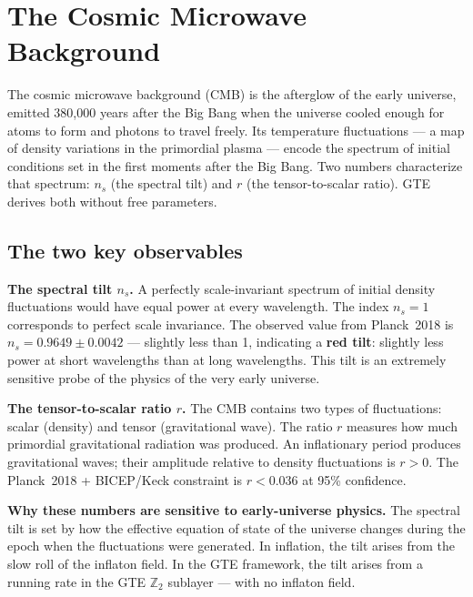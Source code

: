 \documentclass[11pt,a4paper]{article}
\newcommand{\term}[1]{\textbf{#1}}
\newcommand{\ns}{n_s}
\begin{document}
\section{The Cosmic Microwave Background}
\label{sec:cmb}

\begin{tcolorbox}[colback=boxblue,colframe=blue!40!black,
  title=What the CMB tells us]
The cosmic microwave background (CMB) is the afterglow of the early universe,
emitted 380,000 years after the Big Bang when the universe cooled enough
for atoms to form and photons to travel freely.
Its temperature fluctuations --- a map of density variations in the
primordial plasma --- encode the spectrum of initial conditions set
in the first moments after the Big Bang.
Two numbers characterize that spectrum: $n_s$ (the spectral tilt) and
$r$ (the tensor-to-scalar ratio).
GTE derives both without free parameters.
\end{tcolorbox}

\subsection{The two key observables}

\textbf{The spectral tilt $n_s$.}
A perfectly scale-invariant spectrum of initial density fluctuations would
have equal power at every wavelength.
The index $n_s = 1$ corresponds to perfect scale invariance.
The observed value from Planck~2018 is $\ns = 0.9649 \pm 0.0042$ --- slightly
less than 1, indicating a \term{red tilt}: slightly less power at short
wavelengths than at long wavelengths.
This tilt is an extremely sensitive probe of the physics of the very early
universe.

\textbf{The tensor-to-scalar ratio $r$.}
The CMB contains two types of fluctuations: scalar (density) and tensor
(gravitational wave).
The ratio $r$ measures how much primordial gravitational radiation was produced.
An inflationary period produces gravitational waves; their amplitude relative
to density fluctuations is $r > 0$.
The Planck~2018 + BICEP/Keck constraint is $r < 0.036$ at 95\% confidence.

\textbf{Why these numbers are sensitive to early-universe physics.}
The spectral tilt is set by how the effective equation of state of the universe
changes during the epoch when the fluctuations were generated.
In inflation, the tilt arises from the slow roll of the inflaton field.
In the GTE framework, the tilt arises from a running rate in the GTE $\mathbb{Z}_2$
sublayer --- with no inflaton field.
\end{document}
